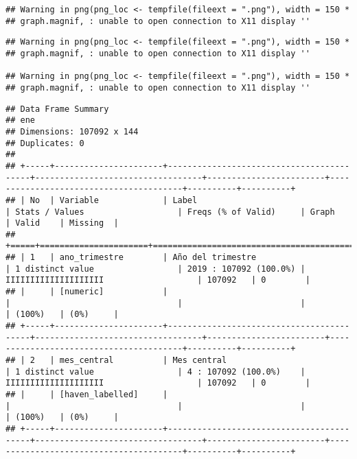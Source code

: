 \documentclass[]{article}
\begin{document}
\begin{verbatim}
## Warning in png(png_loc <- tempfile(fileext = ".png"), width = 150 *
## graph.magnif, : unable to open connection to X11 display ''
\end{verbatim}

\begin{verbatim}
## Warning in png(png_loc <- tempfile(fileext = ".png"), width = 150 *
## graph.magnif, : unable to open connection to X11 display ''

## Warning in png(png_loc <- tempfile(fileext = ".png"), width = 150 *
## graph.magnif, : unable to open connection to X11 display ''
\end{verbatim}

\begin{verbatim}
## Data Frame Summary  
## ene  
## Dimensions: 107092 x 144  
## Duplicates: 0  
## 
## +-----+----------------------+------------------------------------------+----------------------------------+------------------------+----------------------------------------+----------+----------+
## | No  | Variable             | Label                                    | Stats / Values                   | Freqs (% of Valid)     | Graph                                  | Valid    | Missing  |
## +=====+======================+==========================================+==================================+========================+========================================+==========+==========+
## | 1   | ano_trimestre        | Año del trimestre                        | 1 distinct value                 | 2019 : 107092 (100.0%) | IIIIIIIIIIIIIIIIIIII                   | 107092   | 0        |
## |     | [numeric]            |                                          |                                  |                        |                                        | (100%)   | (0%)     |
## +-----+----------------------+------------------------------------------+----------------------------------+------------------------+----------------------------------------+----------+----------+
## | 2   | mes_central          | Mes central                              | 1 distinct value                 | 4 : 107092 (100.0%)    | IIIIIIIIIIIIIIIIIIII                   | 107092   | 0        |
## |     | [haven_labelled]     |                                          |                                  |                        |                                        | (100%)   | (0%)     |
## +-----+----------------------+------------------------------------------+----------------------------------+------------------------+----------------------------------------+----------+----------+

\end{verbatim}
\end{document}
